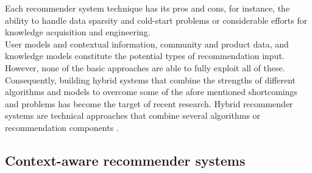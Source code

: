 Each recommender system technique has its pros and cons, for
instance, the ability to handle data sparsity and cold-start problems
or considerable efforts for knowledge acquisition and engineering. \\
User models and contextual information, community and product data,
and knowledge models constitute the potential types of recommendation
input. However, none of the basic approaches are able to fully exploit
all of these. Consequently, building hybrid systems that combine the
strengths of different algorithms and models to overcome some of the
afore mentioned shortcomings and problems has become the target of
recent research. Hybrid recommender systems are technical approaches
that combine several algorithms or recommendation components
\cite{jannach2010recommender}.

\subsection{Context-aware recommender systems}

